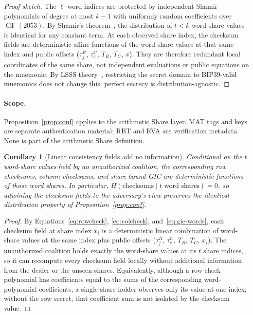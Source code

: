 \documentclass[11pt]{article}
\newcommand{\GF}{\operatorname{GF}}
\newtheorem{corollary}[theorem]{Corollary}
\begin{document}
\begin{proof}[Proof sketch]
The $\ell$ word indices are protected by independent Shamir polynomials of degree at most $k{-}1$ with uniformly random coefficients over $\GF(2053)$. By Shamir's theorem~\cite{shamir1979}, the distribution of $t < k$ word-share values is identical for any constant term. At each observed share index, the checksum fields are deterministic affine functions of the word-share values at that same index and public offsets ($\tau^R_j$, $\tau^C_c$, $T_R$, $T_C$, $x$). They are therefore redundant local coordinates of the same share, not independent evaluations or public equations on the mnemonic. By LSSS theory~\cite{beimel2011,cramer2000}, restricting the secret domain to BIP39-valid mnemonics does not change this: perfect secrecy is distribution-agnostic.
\end{proof}

\paragraph{Scope.} Proposition~\ref{prop:conf} applies to the arithmetic Share layer. MAT tags and keys are separate authentication material; RBT and RVA are verification metadata. None is part of the arithmetic Share definition.

\begin{corollary}[Linear consistency fields add no information]
\label{cor:checks-zero}
Conditional on the $t$ word-share values held by an unauthorized coalition, the corresponding row checksums, column checksums, and share-bound GIC are deterministic functions of those word shares. In particular, $H(\mathrm{checksums} \mid t \text{ word shares}) = 0$, so adjoining the checksum fields to the adversary's view preserves the identical-distribution property of Proposition~\ref{prop:conf}.
\end{corollary}

\begin{proof}
By Equations~\eqref{eq:rowcheck}, \eqref{eq:colcheck}, and~\eqref{eq:gic-words}, each checksum field at share index $x_i$ is a deterministic linear combination of word-share values at the same index plus public offsets ($\tau^R_j$, $\tau^C_c$, $T_R$, $T_C$, $x_i$). The unauthorized coalition holds exactly the word-share values at its $t$ share indices, so it can recompute every checksum field locally without additional information from the dealer or the unseen shares. Equivalently, although a row-check polynomial has coefficients equal to the sums of the corresponding word-polynomial coefficients, a single share holder observes only its value at one index; without the row secret, that coefficient sum is not isolated by the checksum value.
\end{proof}
\end{document}
